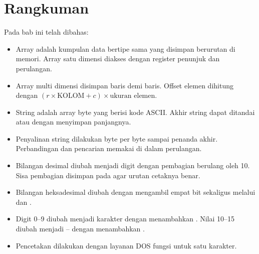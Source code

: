 \section{Rangkuman}
\label{sec:rangkuman-bab15}

Pada bab ini telah dibahas:

\begin{itemize}
    \item Array adalah kumpulan data bertipe sama yang disimpan
          berurutan di memori. Array satu dimensi diakses dengan
          register penunjuk dan perulangan.

    \item Array multi dimensi disimpan baris demi baris. Offset
          elemen dihitung dengan
          $(r \times \text{KOLOM} + c) \times \text{ukuran elemen}$.

    \item String adalah array byte yang berisi kode ASCII. Akhir
          string dapat ditandai  atau dengan menyimpan
          panjangnya.

    \item Penyalinan string dilakukan byte per byte sampai penanda
          akhir. Perbandingan dan pencarian memakai  di
          dalam perulangan.

    \item Bilangan desimal diubah menjadi digit dengan pembagian
          berulang oleh 10. Sisa pembagian disimpan pada
           agar urutan cetaknya benar.

    \item Bilangan heksadesimal diubah dengan mengambil empat bit
          sekaligus melalui  dan  .

    \item Digit 0--9 diubah menjadi karakter dengan menambahkan
          . Nilai 10--15 diubah menjadi --
          dengan menambahkan .

    \item Pencetakan dilakukan dengan layanan DOS
           fungsi  untuk satu karakter.
\end{itemize}

